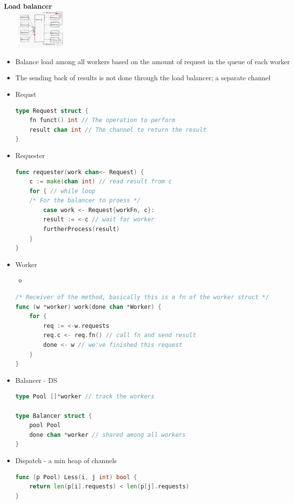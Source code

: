 \documentclass[10pt, landscape]{article}
\begin{document}
\begin{multicols}{4}
\textbf{Load balancer} \\ 
\includegraphics*[width=4cm, height=2cm]{lb1.png}\\
\begin{itemize}
    \item Balance load among all workers based on the amount of request in the queue of each worker 
    \item The sending back of results is not done through the load balancer; a separate channel
    \item Requst 
    \begin{lstlisting}[language=Go, breaklines=true, breakatwhitespace=true]
type Request struct {
    fn funct() int // The operation to perform 
    result chan int // The channel to return the result
}
    \end{lstlisting}
    \item Requester 
    \begin{lstlisting}[language=Go, breaklines=true, breakatwhitespace=true]
func requester(work chan<- Request) {
    c := make(chan int) // read result from c
    for { // while loop 
    /* For the balancer to proess */
        case work <- Request{workFn, c}:
        result := <-c // wait for worker
        furtherProcess(result)
    }
}
    \end{lstlisting}
    \item Worker 
    \begin{itemize}
        \item 
    \end{itemize}
    \begin{lstlisting}[language=Go, breaklines=true, breakatwhitespace=true]
/* Receiver of the method, basically this is a fn of the worker struct */
func (w *worker) work(done chan *Worker) {
    for {
        req := <-w.requests
        req.c <- req.fn() // call fn and send result
        done <- w // we've finished this request
    }
}
    \end{lstlisting}
    \item Balancer - DS
    \begin{lstlisting}[language=Go, breaklines=true, breakatwhitespace=true]
type Pool []*worker // track the workers

type Balancer struct {
    pool Pool
    done chan *worker // shared among all workers
}
    \end{lstlisting}
    \item Dispatch - a min heap of channels 
    \begin{lstlisting}[language=Go, breaklines=true, breakatwhitespace=true]
func (p Pool) Less(i, j int) bool {
    return len(p[i].requests) < len(p[j].requests)
}


\end{lstlisting}
\end{itemize}
\end{multicols}
\end{document}
